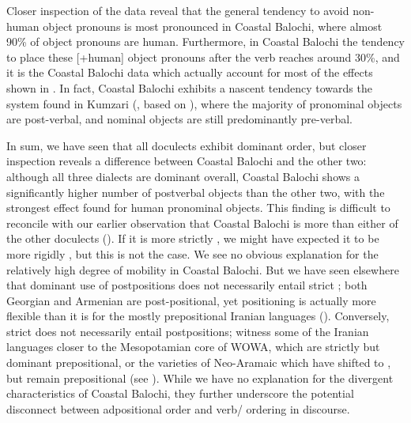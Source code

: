 \documentclass[output=paper,colorlinks,citecolor=brown,draftmode]{langscibook}
\begin{document}
Closer inspection of the data reveal that the general tendency to avoid non-human object pronouns is most pronounced in Coastal Balochi, where almost 90\% of object pronouns are human. Furthermore, in Coastal Balochi the tendency to place these [+human] object pronouns after the verb reaches around 30\%, and it is the Coastal Balochi data which actually account for most of the effects shown in . In fact, Coastal Balochi exhibits a nascent tendency towards the system found in Kumzari (\citealt{haig_kumzari_2022}, based on \citealt{anonby_grammar_2015}), where the majority of pronominal objects are post-verbal, and nominal objects are still predominantly pre-verbal.

\begin{sloppypar}
In sum, we have seen that all doculects exhibit dominant  order, but closer inspection reveals a difference between Coastal Balochi and the other two: although all three dialects are dominant  overall, Coastal Balochi shows a significantly higher number of postverbal objects than the other two, with the strongest effect found for human pronominal objects. This finding is difficult to reconcile with our earlier observation that Coastal Balochi is more  than either of the other doculects (). If it is more strictly , we might have expected it to be more rigidly , but this is not the case. We see no obvious explanation for the relatively high degree of  mobility in Coastal Balochi. But we have seen elsewhere that dominant use of postpositions does not necessarily entail strict ; both Georgian and Armenian are post-positional, yet  positioning is actually more flexible than it is for the mostly prepositional Iranian languages (). Conversely, strict  does not necessarily entail postpositions; witness some of the Iranian languages closer to the Mesopotamian core of WOWA, which are strictly  but dominant prepositional, or the varieties of Neo-Aramaic which have shifted to , but remain prepositional (see ). While we have no explanation for the divergent characteristics of Coastal Balochi, they further underscore the potential disconnect between adpositional order and verb/ ordering in discourse.
\end{sloppypar}
\end{document}
